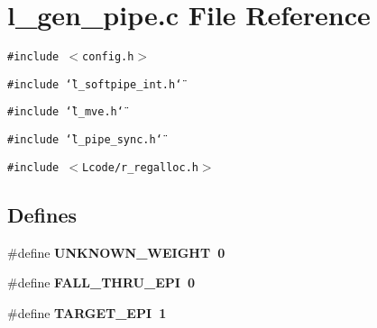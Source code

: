 \section{l\_\-gen\_\-pipe.c File Reference}
\label{l__gen__pipe_8c}
{\tt \#include $<$config.h$>$}\par
{\tt \#include \char`\"{}l\_\-softpipe\_\-int.h\char`\"{}}\par
{\tt \#include \char`\"{}l\_\-mve.h\char`\"{}}\par
{\tt \#include \char`\"{}l\_\-pipe\_\-sync.h\char`\"{}}\par
{\tt \#include $<$Lcode/r\_\-regalloc.h$>$}\par
\subsection*{Defines}
\begin{CompactItemize}
\item 
\#define \bf{UNKNOWN\_\-WEIGHT}~0
\item 
\#define \bf{FALL\_\-THRU\_\-EPI}~0
\item 
\#define \bf{TARGET\_\-EPI}~1
\end{CompactItemize}
